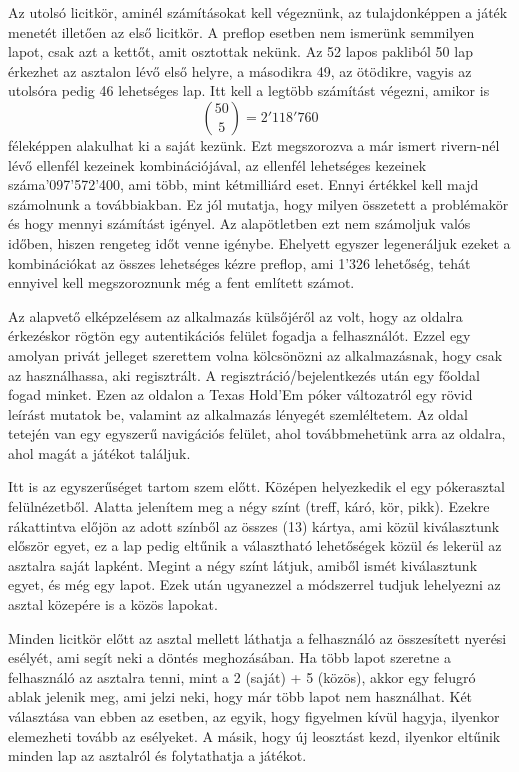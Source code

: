 Az utolsó licitkör, aminél számításokat kell végeznünk, az tulajdonképpen a játék menetét illetően az első licitkör. A preflop esetben nem ismerünk semmilyen lapot, csak azt a kettőt, amit osztottak nekünk. Az 52 lapos pakliból 50 lap érkezhet az asztalon lévő első helyre, a másodikra 49, az ötödikre, vagyis az utolsóra pedig 46 lehetséges lap. Itt kell a legtöbb számítást végezni, amikor is \[ \binom{50}{5}=2'118'760\] féleképpen alakulhat ki a saját kezünk. Ezt megszorozva a már ismert rivern-nél lévő ellenfél kezeinek kombinációjával, az ellenfél lehetséges kezeinek száma'097'572'400, ami több, mint kétmilliárd eset. Ennyi értékkel kell majd számolnunk a továbbiakban. Ez jól mutatja, hogy milyen összetett a problémakör és hogy mennyi számítást igényel. Az alapötletben ezt nem számoljuk valós időben, hiszen rengeteg időt venne igénybe. Ehelyett egyszer legeneráljuk ezeket a kombinációkat az összes lehetséges kézre preflop, ami 1'326 lehetőség, tehát ennyivel kell megszoroznunk még a fent említett számot.


Az alapvető elképzelésem az alkalmazás külsőjéről az volt, hogy az oldalra érkezéskor rögtön egy autentikációs felület fogadja a felhasználót. Ezzel egy amolyan privát jelleget szerettem volna kölcsönözni az alkalmazásnak, hogy csak az használhassa, aki regisztrált. A regisztráció/bejelentkezés után egy főoldal fogad minket. Ezen az oldalon a Texas Hold'Em póker változatról egy rövid leírást mutatok be, valamint az alkalmazás lényegét szemléltetem. Az oldal tetején van egy egyszerű navigációs felület, ahol továbbmehetünk arra az oldalra, ahol magát a játékot találjuk.

Itt is az egyszerűséget tartom szem előtt. Középen helyezkedik el egy pókerasztal felülnézetből. Alatta jelenítem meg a négy színt (treff, káró, kör, pikk). Ezekre rákattintva előjön az adott színből az összes (13) kártya, ami közül kiválasztunk először egyet, ez a lap pedig eltűnik a választható lehetőségek közül és lekerül az asztalra saját lapként. Megint a négy színt látjuk, amiből ismét kiválasztunk egyet, és még egy lapot. Ezek után ugyanezzel a módszerrel tudjuk lehelyezni az asztal közepére is a közös lapokat.

Minden licitkör előtt az asztal mellett láthatja a felhasználó az összesített nyerési esélyét, ami segít neki a döntés meghozásában. Ha több lapot szeretne a felhasználó az asztalra tenni, mint a 2 (saját) + 5 (közös), akkor egy felugró ablak jelenik meg, ami jelzi neki, hogy már több lapot nem használhat. Két választása van ebben az esetben, az egyik, hogy figyelmen kívül hagyja, ilyenkor elemezheti tovább az esélyeket. A másik, hogy új leosztást kezd, ilyenkor eltűnik minden lap az asztalról és folytathatja a játékot.

